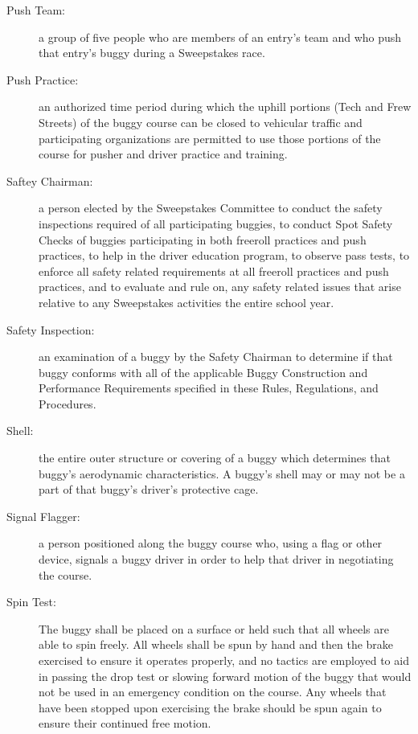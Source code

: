 \begin{description}
	\item[Push Team:]
	a group of five people who are members of an entry's team and who push that
	entry's buggy during a Sweepstakes race.

	\item[Push Practice:]
	an authorized time period during which the uphill portions (Tech and Frew
	Streets) of the buggy course can be closed to vehicular traffic and
	participating organizations are permitted to use those portions of the course
	for pusher and driver practice and training.

	\item[Saftey Chairman:]
	a person elected by the Sweepstakes Committee to conduct the safety
	inspections required of all participating buggies, to conduct Spot Safety
	Checks of buggies participating in both freeroll practices and push practices,
	to help in the driver education program, to observe pass tests, to enforce all
	safety related requirements at all freeroll practices and push practices, and
	to evaluate and rule on, any safety related issues that arise relative to any
	Sweepstakes activities the entire school year.

	\item[Safety Inspection:]
	an examination of a buggy by the Safety Chairman to determine if that buggy
	conforms with all of the applicable Buggy Construction and Performance
	Requirements specified in these Rules, Regulations, and Procedures.

	\item[Shell:]
	the entire outer structure or covering of a buggy which determines that
	buggy's aerodynamic characteristics. A buggy's shell may or may not be a part
	of that buggy's driver's protective cage.

	\item[Signal Flagger:]
	a person positioned along the buggy course who, using a flag or other
	device, signals a buggy driver in order to help that driver in negotiating the
	course.
	
	\item[Spin Test:]
	The buggy shall be placed on a surface or held such that all wheels are able to 
	spin freely. All wheels shall be spun by hand and then the brake exercised to 
	ensure it operates properly, and no tactics are employed to aid in passing the 
	drop test or slowing forward motion of the buggy that would not be used in an 
	emergency condition on the course. Any wheels that have been stopped upon 
	exercising the brake should be spun again to ensure their continued free 
	motion.


\end{description}
